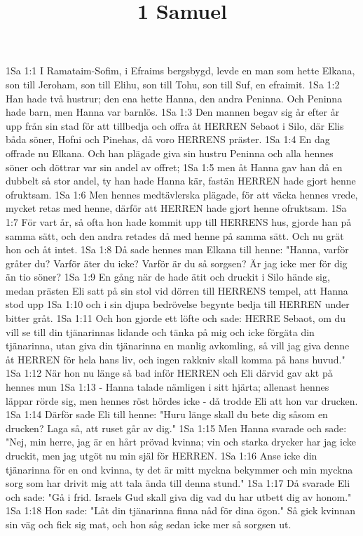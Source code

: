 

\title{1 Samuel}

1Sa 1:1  I Ramataim-Sofim, i Efraims bergsbygd, levde en man som hette Elkana, son till Jeroham, son till Elihu, son till Tohu, son till Suf, en efraimit.
1Sa 1:2  Han hade två hustrur; den ena hette Hanna, den andra Peninna. Och Peninna hade barn, men Hanna var barnlös.
1Sa 1:3  Den mannen begav sig år efter år upp från sin stad för att tillbedja och offra åt HERREN Sebaot i Silo, där Elis båda söner, Hofni och Pinehas, då voro HERRENS präster.
1Sa 1:4  En dag offrade nu Elkana. Och han plägade giva sin hustru Peninna och alla hennes söner och döttrar var sin andel av offret;
1Sa 1:5  men åt Hanna gav han då en dubbelt så stor andel, ty han hade Hanna kär, fastän HERREN hade gjort henne ofruktsam.
1Sa 1:6  Men hennes medtävlerska plägade, för att väcka hennes vrede, mycket retas med henne, därför att HERREN hade gjort henne ofruktsam.
1Sa 1:7  För vart år, så ofta hon hade kommit upp till HERRENS hus, gjorde han på samma sätt, och den andra retades då med henne på samma sätt. Och nu grät hon och åt intet.
1Sa 1:8  Då sade hennes man Elkana till henne: "Hanna, varför gråter du? Varför äter du icke? Varför är du så sorgsen? Är jag icke mer för dig än tio söner?
1Sa 1:9  En gång när de hade ätit och druckit i Silo hände sig, medan prästen Eli satt på sin stol vid dörren till HERRENS tempel, att Hanna stod upp
1Sa 1:10  och i sin djupa bedrövelse begynte bedja till HERREN under bitter gråt.
1Sa 1:11  Och hon gjorde ett löfte och sade: HERRE Sebaot, om du vill se till din tjänarinnas lidande och tänka på mig och icke förgäta din tjänarinna, utan giva din tjänarinna en manlig avkomling, så vill jag giva denne åt HERREN för hela hans liv, och ingen rakkniv skall komma på hans huvud."
1Sa 1:12  När hon nu länge så bad inför HERREN och Eli därvid gav akt på hennes mun
1Sa 1:13  - Hanna talade nämligen i sitt hjärta; allenast hennes läppar rörde sig, men hennes röst hördes icke - då trodde Eli att hon var drucken.
1Sa 1:14  Därför sade Eli till henne: "Huru länge skall du bete dig såsom en drucken? Laga så, att ruset går av dig."
1Sa 1:15  Men Hanna svarade och sade: "Nej, min herre, jag är en hårt prövad kvinna; vin och starka drycker har jag icke druckit, men jag utgöt nu min själ för HERREN.
1Sa 1:16  Anse icke din tjänarinna för en ond kvinna, ty det är mitt myckna bekymmer och min myckna sorg som har drivit mig att tala ända till denna stund."
1Sa 1:17  Då svarade Eli och sade: "Gå i frid. Israels Gud skall giva dig vad du har utbett dig av honom."
1Sa 1:18  Hon sade: "Låt din tjänarinna finna nåd för dina ögon." Så gick kvinnan sin väg och fick sig mat, och hon såg sedan icke mer så sorgsen ut.
